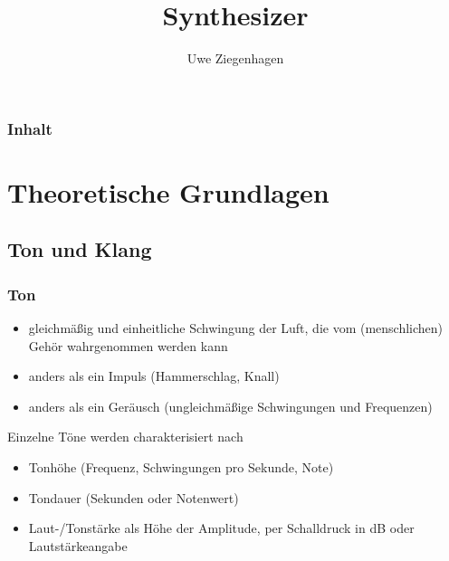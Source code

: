 \documentclass[12pt,ngerman]{beamer}
\author{Uwe Ziegenhagen}
\title{Synthesizer}
\begin{document}
 
\begin{frame}
\frametitle{Inhalt}

\tableofcontents

\end{frame}
 
\section{Theoretische Grundlagen}

\subsection{Ton und Klang}

\begin{frame}
\frametitle{Ton}

\begin{itemize}
	\item gleichmäßig und einheitliche Schwingung der Luft, die vom (menschlichen) Gehör wahrgenommen werden kann
	\item anders als ein Impuls (Hammerschlag, Knall)
	\item anders als ein Geräusch (ungleichmäßige Schwingungen und Frequenzen)
\end{itemize}\vspace*{1em}

Einzelne Töne werden charakterisiert nach \vspace*{0.5em}

\begin{itemize}
	\item Tonhöhe (Frequenz, Schwingungen pro Sekunde, Note)
	\item Tondauer (Sekunden oder Notenwert)
	\item Laut-/Tonstärke als Höhe der Amplitude, per Schalldruck in dB oder Lautstärkeangabe
\end{itemize}

\end{frame}
\end{document}
